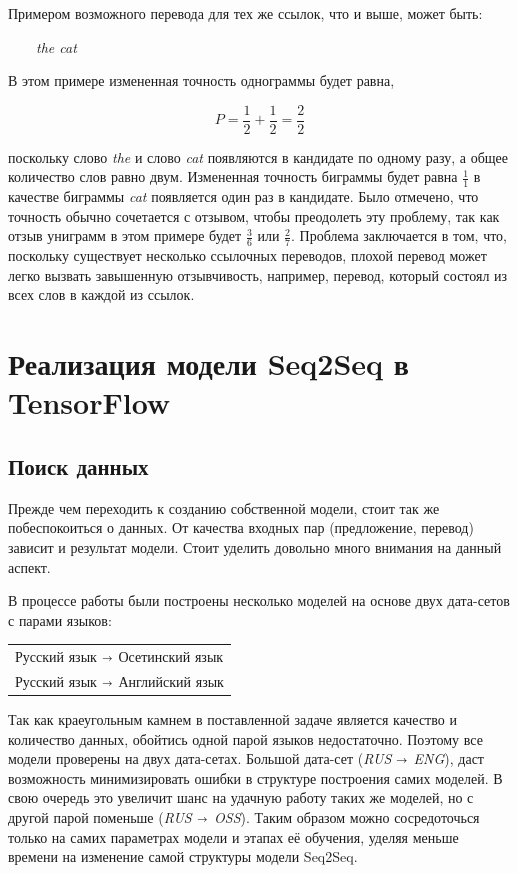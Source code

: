     Примером возможного перевода для тех же ссылок, что и выше, может быть:
    
    \ \ \ \ \textit{the cat}
    
    В этом примере измененная точность однограммы будет равна,
    
    $$
        P = \frac{1}{2} + \frac{1}{2} = \frac{2}{2}
    $$
    
    поскольку слово \textit{the} и слово \textit{cat} появляются в кандидате по одному разу, а общее количество слов равно двум. Измененная точность биграммы будет равна $\frac{1}{1}$ в качестве биграммы \textit{cat} появляется один раз в кандидате. Было отмечено, что точность обычно сочетается с отзывом, чтобы преодолеть эту проблему, так как отзыв униграмм в этом примере будет $\frac{3}{6}$ или $\frac{2}{7}$. Проблема заключается в том, что, поскольку существует несколько ссылочных переводов, плохой перевод может легко вызвать завышенную отзывчивость, например, перевод, который состоял из всех слов в каждой из ссылок.
    
	\clearpage

	\section{Реализация модели Seq2Seq в TensorFlow}
	
	\subsection{Поиск данных}
	
	Прежде чем переходить к созданию собственной модели, стоит так же побеспокоиться о данных. От качества входных пар (предложение, перевод) зависит и результат модели. Стоит уделить довольно много внимания на данный аспект.
	
	В процессе работы были построены несколько моделей на основе двух дата-сетов с парами языков:
    
    \begin{table}[h]
        \centering
        \begin{tabular}{l}
            Русский язык $\shortrightarrow$ Осетинский язык \\
            Русский язык $\shortrightarrow$ Английский язык \\
        \end{tabular}
    \end{table}
    
    Так как краеугольным камнем в поставленной задаче является качество и количество данных, обойтись одной парой языков недостаточно. Поэтому все модели проверены на двух дата-сетах. Большой дата-сет (\textit{RUS $\shortrightarrow$ ENG}), даст возможность минимизировать ошибки в структуре построения самих моделей. В свою очередь это увеличит шанс на удачную работу таких же моделей, но с другой парой поменьше (\textit{RUS $\shortrightarrow$ OSS}). Таким образом можно сосредоточься только на самих параметрах модели и этапах её обучения, уделяя меньше времени на изменение самой структуры модели Seq2Seq.
	
